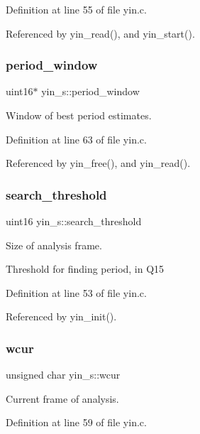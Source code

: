 Definition at line 55 of file yin.\+c.



Referenced by yin\+\_\+read(), and yin\+\_\+start().

\mbox{\label{structyin__s_a1928cec127e250f6cd15249085bc9fc8}} 
\subsubsection{period\+\_\+window}
{\footnotesize\ttfamily uint16$\ast$ yin\+\_\+s\+::period\+\_\+window}



Window of best period estimates. 



Definition at line 63 of file yin.\+c.



Referenced by yin\+\_\+free(), and yin\+\_\+read().

\mbox{\label{structyin__s_a8cca938167af6b504458ff9578420afd}} 
\subsubsection{search\+\_\+threshold}
{\footnotesize\ttfamily uint16 yin\+\_\+s\+::search\+\_\+threshold}



Size of analysis frame. 

Threshold for finding period, in Q15 

Definition at line 53 of file yin.\+c.



Referenced by yin\+\_\+init().

\mbox{\label{structyin__s_ab79376deb3761d5d3ae72f727ac25660}} 
\subsubsection{wcur}
{\footnotesize\ttfamily unsigned char yin\+\_\+s\+::wcur}



Current frame of analysis. 



Definition at line 59 of file yin.\+c.



